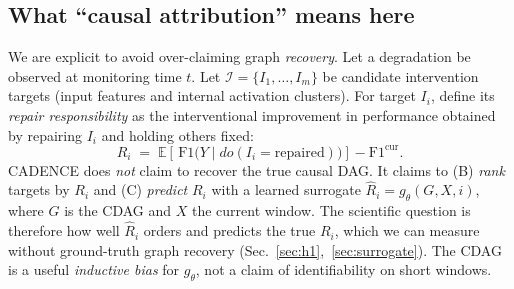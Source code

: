 \documentclass[conference]{IEEEtran}
\begin{document}
\subsection{What ``causal attribution'' means here}
We are explicit to avoid over-claiming graph \emph{recovery}. Let a
degradation be observed at monitoring time $t$. Let
$\mathcal{I}=\{I_1,\dots,I_m\}$ be candidate intervention targets (input
features and internal activation clusters). For target $I_i$, define its
\emph{repair responsibility} as the interventional improvement in
performance obtained by repairing $I_i$ and holding others fixed:
\begin{equation}
R_i \;=\; \mathbb{E}\!\left[\,\mathrm{F1}\big(Y \mid do(I_i{=}\text{repaired})\big)\right] - \mathrm{F1}^{\text{cur}} .
\label{eq:responsibility}
\end{equation}
CADENCE does \emph{not} claim to recover the true causal DAG. It claims
to (B) \emph{rank} targets by $R_i$ and (C) \emph{predict} $R_i$ with a
learned surrogate $\hat R_i = g_\theta(G, X, i)$, where $G$ is the CDAG and
$X$ the current window. The scientific question is therefore how well
$\hat R_i$ orders and predicts the true $R_i$, which we can measure without
ground-truth graph recovery (Sec.~\ref{sec:h1},~\ref{sec:surrogate}). The
CDAG is a useful \emph{inductive bias} for $g_\theta$, not a claim of
identifiability on short windows.
\end{document}
